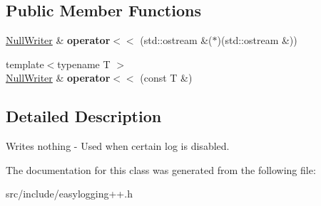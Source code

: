 \subsection*{Public Member Functions}
\begin{DoxyCompactItemize}
\item 
\mbox{\label{classel_1_1base_1_1_null_writer_a39cb7d47986d70c2b4e9d78d1482da7d}} 
\hyperlink{classel_1_1base_1_1_null_writer}{Null\+Writer} \& {\bfseries operator$<$$<$} (std\+::ostream \&($\ast$)(std\+::ostream \&))
\item 
\mbox{\label{classel_1_1base_1_1_null_writer_a57cb0f5d93ebac076b8ef94d6eff65a2}} 
{\footnotesize template$<$typename T $>$ }\\\hyperlink{classel_1_1base_1_1_null_writer}{Null\+Writer} \& {\bfseries operator$<$$<$} (const T \&)
\end{DoxyCompactItemize}


\subsection{Detailed Description}
Writes nothing -\/ Used when certain log is disabled. 

The documentation for this class was generated from the following file\+:\begin{DoxyCompactItemize}
\item 
src/include/easylogging++.\+h\end{DoxyCompactItemize}
